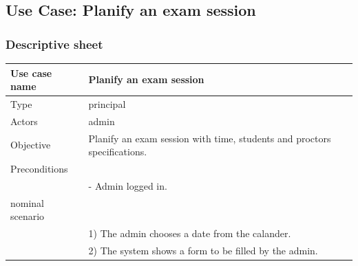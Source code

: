 \documentclass[]{uc2pfecaneva}
\begin{document}
    \begin{table}[t]
        \raggedright\subsection{Use Case: Planify an exam session}
        \subsubsection{Descriptive sheet}
        \centering
        \begin{tabularx}{\textwidth}{|l|X|}
            \hline
            Use case name         & Planify an exam session                                                                                                                                            \\ \hline
            Type                  & principal                                                                                                                                                         \\ \hline
            Actors                & admin                                                                                                                                                             \\ \hline
            Objective             & Planify an exam session with time, students and proctors specifications.                                                                                           \\ \hline
            Preconditions         &                                                                                                                                                                   \\
            & - Admin logged in.                                                                                                                                                \\\hline
            nominal scenario      &                                                                                                                                                                   \\
            & 1) The admin chooses a date from the calander.                                                                                                           \\
            & 2) The system shows a form to be filled by the admin.                                                                                                             \\

\end{tabularx}
\end{table}
\end{document}
